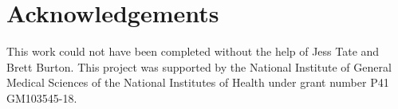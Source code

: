 %   

\section{Acknowledgements}
\label{sec:acknowl}
 This work could not have been completed without the help of Jess Tate and Brett Burton. This project was supported by the National Institute of General Medical Sciences of the National Institutes   of Health under grant number P41 GM103545-18. 